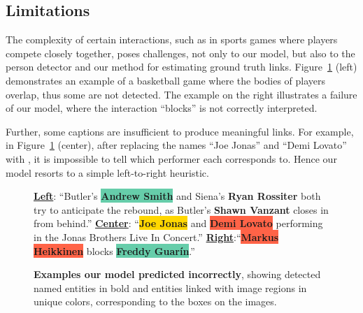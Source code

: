 \subsection{Limitations}

The complexity of certain interactions, such as in sports games where players compete closely together, poses challenges, not only to our model, but also to the person detector and our method for estimating ground truth links. Figure~\ref{fig:limitations} (left) demonstrates an example of a basketball game where the bodies of players overlap, thus some are not detected. The example on the right illustrates a failure of our model, where the interaction ``blocks'' is not correctly interpreted.

Further, some captions are insufficient to produce meaningful links. For example, in Figure~\ref{fig:limitations} (center), after replacing the names ``Joe Jonas'' and ``Demi Lovato'' with \NAME, it is impossible to tell which performer each corresponds to. Hence our model resorts to a simple left-to-right heuristic.

\begin{figure}
  \hfill
{} 
\hfill
{} 
\newline
 {\leftskip=0.1pt   \footnotesize{
  \textbf{\underline{Left}}: ``Butler's \colorbox{mediumaquamarine}{\textbf{Andrew Smith}} and Siena's \textbf{Ryan Rossiter} both try to anticipate the rebound, as Butler's \textbf{Shawn Vanzant} closes in from behind.''
  \newline
  \textbf{\underline{Center}}: ``\colorbox{gold}{\textbf{Joe Jonas}} and \colorbox{tomato}{\textbf{Demi Lovato}} performing in the Jonas Brothers Live In Concert.''}
  \newline
  \textbf{\underline{Right}}:``\colorbox{tomato}{\textbf{Markus Heikkinen}} blocks \colorbox{mediumaquamarine}{\textbf{Freddy Guarín}}.''}
  \vspace{3pt}
  \caption{
  \textbf{Examples our model predicted incorrectly}, showing detected named entities in bold and entities linked with image regions in unique colors, corresponding to the boxes on the images. }\label{fig:limitations}
\end{figure}

 